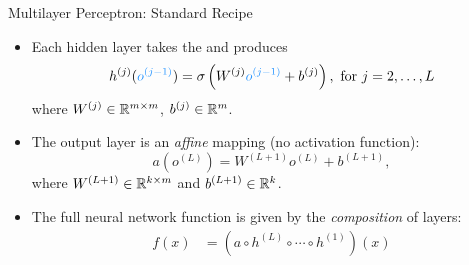 \documentclass[usenames,dvipsnames,notes,11pt,aspectratio=169,hyperref={colorlinks=true, linkcolor=blue}]{beamer}
\begin{document}
\begin{frame}{Multilayer Perceptron: Standard Recipe}
\begin{itemize}[<+->]
    \item Each hidden layer takes the  and produces
\[
h^{(j)}({\color{blue}o^{(j-1)}})=\sigma\left(W^{(j)}{\color{blue}o^{(j-1)}}+b^{(j)}\right),\text{ for }j=2,\ldots,L
\]
where $W^{(j)}\in\mathbb{R}^{m\times m}$, $b^{(j)}\in\mathbb{R}^{m}$.

\item The output layer is an \emph{affine} mapping (no activation function): 
\[
a(o^{(L)})=W^{(L+1)}o^{(L)}+b^{(L+1)},
\]
where $W^{(L+1)}\in\mathbb{R}^{k\times m}$ and $b^{(L+1)}\in\mathbb{R}^{k}$.

\item The full neural network function is given by the \emph{composition} of
layers:
\begin{align}
f(x) &= \left(a\circ h^{(L)}\circ\cdots\circ h^{(1)}\right)(x)
\end{align}

\end{itemize}
\end{frame}
\end{document}
